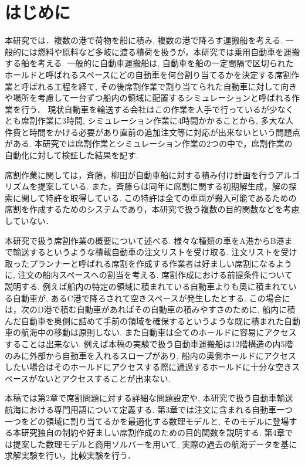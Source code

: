 \chapter{はじめに}
本研究では．複数の港で荷物を船に積み, 複数の港で降ろす運搬船を考える. 一般的には燃料や原料など多岐に渡る積荷を扱うが，本研究では乗用自動車を運搬する船を考える. 一般的に自動車運搬船は, 自動車を船の一定間隔で区切られたホールドと呼ばれるスペースにどの自動車を何台割り当てるかを決定する席割作業と呼ばれる工程を経て, その後席割作業で割り当てられた自動車に対して向きや場所を考慮して一台ずつ船内の領域に配置するシミュレーションと呼ばれる作業を行う． 現状自動車を輸送する会社はこの作業を人手で行っているが少なくとも席割作業に3時間, シミュレーション作業に4時間かかることから, 多大な人件費と時間をかける必要があり直前の追加注文等に対応が出来ないという問題点がある\cite{mitsui}. 本研究では席割作業とシミュレーション作業の2つの中で，席割作業の自動化に対して検証した結果を記す.

席割作業に関しては，斉藤，柳田が自動車船に対する積み付け計画を行うアルゴリズムを提案している\cite{saito}. また，斉藤らは同年に席割に関する初期解生成，解の探索に関して特許を取得している\cite{tokkyo}.
この特許は全ての車両が搬入可能であるための席割を作成するためのシステムであり，本研究で扱う複数の目的関数などを考慮していない．

本研究で扱う席割作業の概要について述べる. 様々な種類の車をA港からB港まで輸送するというような積載自動車の注文リストを受け取る. 注文リストを受け取ったプランナーと呼ばれる席割を作成する作業者は好ましい席割になるように, 注文の船内スペースへの割当を考える. 席割作成における前提条件について説明する. 例えば船内の特定の領域に積まれている自動車よりも奥に積まれている自動車が, あるC港で降ろされて空きスペースが発生したとする. この場合には，次のD港で積む自動車があればその自動車の積みやすさのために, 船内に積んだ自動車を奥側に詰めて手前の領域を確保するというような既に積まれた自動車の航海中の移動は原則しない. また自動車は全てのホールドに容易にアクセスすることは出来ない. 例えば本稿の実験で扱う自動車運搬船は12階構造の内5階のみに外部から自動車を入れるスロープがあり, 船内の奥側ホールドにアクセスしたい場合はそのホールドにアクセスする際に通過するホールドに十分な空きスペースがないとアクセスすることが出来ない.

本稿では第2章で席割問題に対する詳細な問題設定や, 本研究で扱う自動車輸送航海における専門用語について定義する.  第3章では注文に含まれる自動車一つ一つをどの領域に割り当てるかを最適化する数理モデルと, そのモデルに登場する本研究独自の制約や好ましい席割作成のための目的関数を説明する. 第4章では提案した数理モデルと商用ソルバーを用いて, 実際の過去の航海データを基に求解実験を行い，比較実験を行う．
